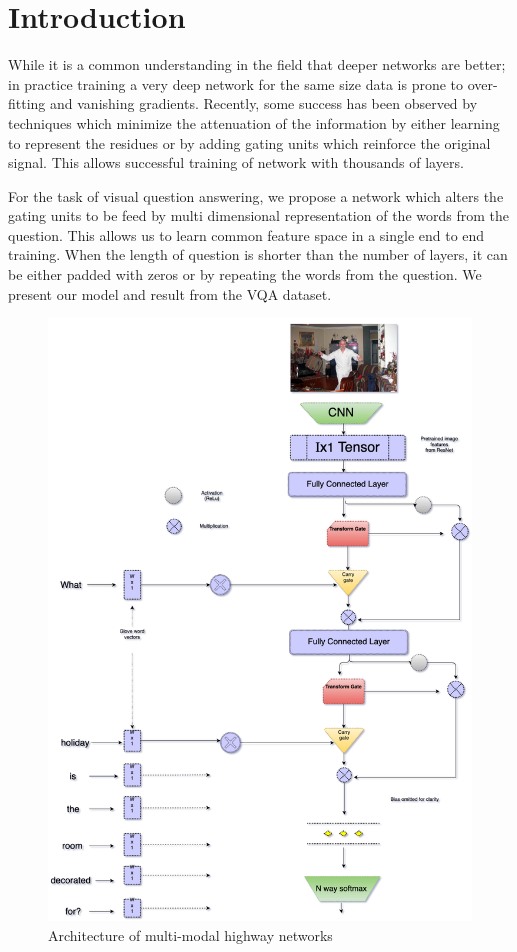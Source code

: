 \section{Introduction}

While it is a common understanding in the field that deeper networks are better\cite{ba2014deep}; in practice training a very deep network for the same size data is prone to over-fitting and vanishing gradients. Recently, some success has been observed by techniques which minimize the attenuation of the information by either learning to represent the residues\cite{he2015deep} or by adding gating units which reinforce the original signal\cite{srivastava2015highway}. This allows successful training of network with thousands of layers.

For the task of visual question answering, we propose a network which alters the gating units to be feed by multi dimensional representation of the words from the question. This allows us to learn common feature space in a single end to end training. When the length of question is shorter than the number of layers, it can be either padded with zeros or by repeating the words from the question. We present our model and result from the VQA dataset\cite{antol2015vqa}. 

\begin{figure}[H]
\centering
   \includegraphics[width=1\linewidth, scale=0.9]{figures/vqa/model.pdf}
    \caption{Architecture of multi-modal highway networks}
    \label{fig:long}
    \label{fig:onecol}
\end{figure}
